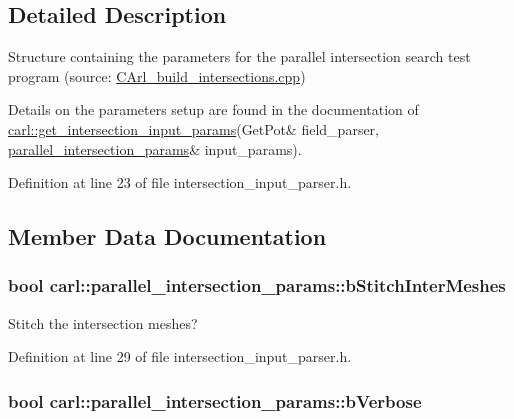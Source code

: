 \subsection{Detailed Description}
Structure containing the parameters for the parallel intersection search test program (source\+: \hyperlink{_c_arl__build__intersections_8cpp}{C\+Arl\+\_\+build\+\_\+intersections.\+cpp}) 

Details on the parameters setup are found in the documentation of \hyperlink{namespacecarl_ab80eec3eb20ff6a403ad01bafa649df2}{carl\+::get\+\_\+intersection\+\_\+input\+\_\+params}(Get\+Pot\& field\+\_\+parser, \hyperlink{structcarl_1_1parallel__intersection__params}{parallel\+\_\+intersection\+\_\+params}\& input\+\_\+params). 

Definition at line 23 of file intersection\+\_\+input\+\_\+parser.\+h.



\subsection{Member Data Documentation}
\hypertarget{structcarl_1_1parallel__intersection__params_a16529af2562e264bf3c5822d8d653b08}{}
\subsubsection[{b\+Stitch\+Inter\+Meshes}]{\setlength{\rightskip}{0pt plus 5cm}bool carl\+::parallel\+\_\+intersection\+\_\+params\+::b\+Stitch\+Inter\+Meshes}\label{structcarl_1_1parallel__intersection__params_a16529af2562e264bf3c5822d8d653b08}


Stitch the intersection meshes? 



Definition at line 29 of file intersection\+\_\+input\+\_\+parser.\+h.

\hypertarget{structcarl_1_1parallel__intersection__params_a15197709febaff5f7082264db05d2aa7}{}
\subsubsection[{b\+Verbose}]{\setlength{\rightskip}{0pt plus 5cm}bool carl\+::parallel\+\_\+intersection\+\_\+params\+::b\+Verbose}\label{structcarl_1_1parallel__intersection__params_a15197709febaff5f7082264db05d2aa7}


